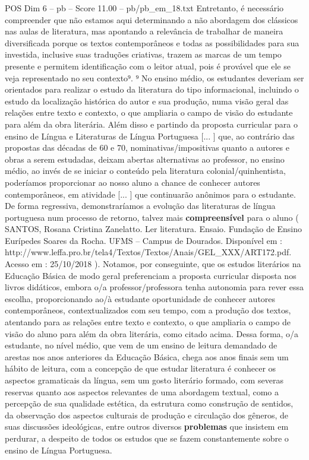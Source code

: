 \begin{textsample}{POS Dim 6 – pb – Score 11.00 – pb/pb\_em\_18.txt}
Entretanto, é necessário compreender que não estamos aqui determinando a não abordagem dos clássicos nas aulas de literatura, mas apontando a relevância de trabalhar de maneira diversificada porque os textos contemporâneos e todas as possibilidades para sua investida, inclusive suas traduções criativas, trazem as marcas de um tempo presente e permitem identificação com o leitor atual, pois é provável que ele se veja representado no seu contexto⁹. ⁹ No ensino médio, os estudantes deveriam ser orientados para realizar o estudo da literatura do tipo informacional, incluindo o estudo da localização histórica do autor e sua produção, numa visão geral das relações entre texto e contexto, o que ampliaria o campo de visão do estudante para além da obra literária.
Além disso e partindo da proposta curricular para o ensino de Língua e Literaturas de Língua Portuguesa [... ] que, ao contrário das propostas das décadas de 60 e 70, nominativas/impositivas quanto a autores e obras a serem estudadas, deixam abertas alternativas ao professor, no ensino médio, ao invés de se iniciar o conteúdo pela literatura colonial/quinhentista, poderíamos proporcionar ao nosso aluno a chance de conhecer autores contemporâneos, em atividade [... ] que continuarão anônimos para o estudante.
De forma regressiva, demonstraríamos a evolução das literaturas de língua portuguesa num processo de retorno, talvez mais \textbf{compreensível} para o aluno ( SANTOS, Rosana Cristina Zanelatto.
Ler literatura.
Ensaio.
Fundação de Ensino Eurípedes Soares da Rocha.
UFMS – Campus de Dourados.
Disponível em : http://www.leffa.pro.br/tela4/Textos/Textos/Anais/GEL\_XXX/ART172.pdf.
Acesso em : 25/10/2018 ).
Notamos, por conseguinte, que os estudos literários na Educação Básica de modo geral preferenciam a proposta curricular disposta nos livros didáticos, embora o/a professor/professora tenha autonomia para rever essa escolha, proporcionando ao/à estudante oportunidade de conhecer autores contemporâneos, contextualizados com seu tempo, com a produção dos textos, atentando para as relações entre texto e contexto, o que ampliaria o campo de visão do aluno para além da obra literária, como citado acima.
Dessa forma, o/a estudante, no nível médio, que vem de um ensino de leitura demandado de arestas nos anos anteriores da Educação Básica, chega aos anos finais sem um hábito de leitura, com a concepção de que estudar literatura é conhecer os aspectos gramaticais da língua, sem um gosto literário formado, com severas reservas quanto aos aspectos relevantes de uma abordagem textual, como a percepção de sua qualidade estética, da estrutura como construção de sentidos, da observação dos aspectos culturais de produção e circulação dos gêneros, de suas discussões ideológicas, entre outros diversos \textbf{problemas} que insistem em perdurar, a despeito de todos os estudos que se fazem constantemente sobre o ensino de Língua Portuguesa.

\end{textsample}
